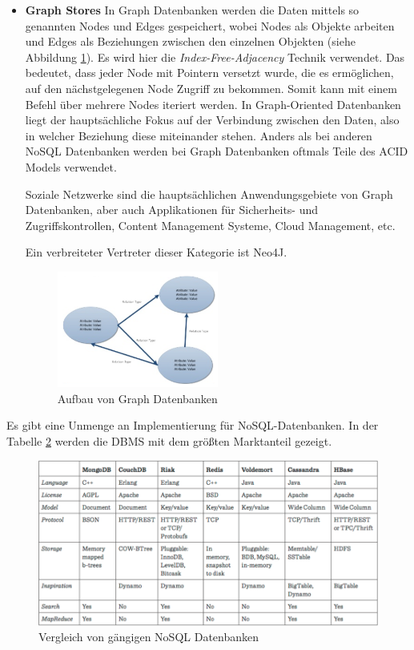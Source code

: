 \begin{itemize}
	\clearpage

	\item \textbf{Graph Stores\newline}
	In Graph Datenbanken werden die Daten mittels so genannten Nodes und Edges gespeichert, wobei Nodes als Objekte arbeiten und Edges als Beziehungen zwischen den einzelnen Objekten (siehe Abbildung \ref{fig:graphdb}). Es wird hier die \textit{Index-Free-Adjacency} Technik verwendet. Das bedeutet, dass jeder Node mit Pointern versetzt wurde, die es ermöglichen, auf den nächstgelegenen Node Zugriff zu bekommen. Somit kann mit einem Befehl über mehrere Nodes iteriert werden. In Graph-Oriented Datenbanken liegt der hauptsächliche Fokus auf der Verbindung zwischen den Daten, also in welcher Beziehung diese miteinander stehen. Anders als bei anderen NoSQL Datenbanken werden bei Graph Datenbanken oftmals Teile des ACID Models verwendet.

	Soziale Netzwerke sind die hauptsächlichen Anwendungsgebiete von Graph Datenbanken, aber auch Applikationen für Sicherheits- und Zugriffskontrollen, Content Management Systeme, Cloud Management, etc. 

	Ein verbreiteter Vertreter dieser Kategorie ist Neo4J.

	\begin{figure}[h]\centering
		\includegraphics[width=0.5\textwidth]{images/graphStore}
		\caption{Aufbau von Graph Datenbanken}
		\label{fig:graphdb}
	\end{figure}
\end{itemize}
\clearpage

Es gibt eine Unmenge an Implementierung für NoSQL-Datenbanken. In der Tabelle \ref{fig:nosqlcomp} werden die DBMS mit dem größten Marktanteil gezeigt.

\begin{figure}[!htb]\centering
	\includegraphics[width=1\textwidth]{images/noSQLComp}
	\caption{Vergleich von gängigen NoSQL Datenbanken \cite{MELD.CH2-dbms.compNoSQL}}
	\label{fig:nosqlcomp}
\end{figure}


\clearpage %